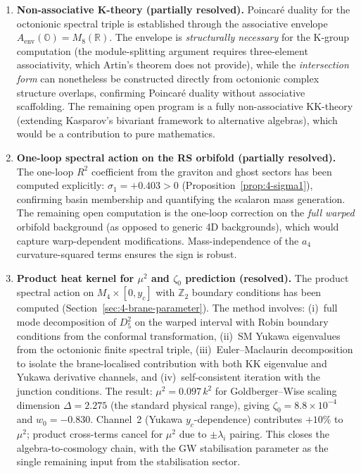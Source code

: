 \begin{enumerate}
  \item \textbf{Non-associative K-theory (partially resolved).} Poincar\'{e} duality for the octonionic spectral triple is established through the associative envelope $A_{\mathrm{env}}(\mathbb{O}) = M_8(\mathbb{R})$.  The envelope is \emph{structurally necessary} for the K-group computation (the module-splitting argument requires three-element associativity, which Artin's theorem does not provide), while the \emph{intersection form} can nonetheless be constructed directly from octonionic complex structure overlaps, confirming Poincar\'{e} duality without associative scaffolding.  The remaining open program is a fully non-associative KK-theory (extending Kasparov's bivariant framework to alternative algebras), which would be a contribution to pure mathematics.

  \item \textbf{One-loop spectral action on the RS orbifold (partially resolved).} The one-loop $R^2$ coefficient from the graviton and ghost sectors has been computed explicitly: $\sigma_1 = +0.403 > 0$ (Proposition~\ref{prop:4-sigma1}), confirming basin membership and quantifying the scalaron mass generation.  The remaining open computation is the one-loop correction on the \emph{full warped} orbifold background (as opposed to generic 4D backgrounds), which would capture warp-dependent modifications.  Mass-independence of the $a_4$ curvature-squared terms ensures the sign is robust.

  \item\label{item:op-8} \textbf{Product heat kernel for $\mu^2$ and $\zeta_0$ prediction (resolved).} The product spectral action on $M_4 \times [0, y_c]$ with $\mathbb{Z}_2$ boundary conditions has been computed (Section~\ref{sec:4-brane-parameter}).  The method involves: (i)~full mode decomposition of $D_5^2$ on the warped interval with Robin boundary conditions from the conformal transformation, (ii)~SM Yukawa eigenvalues from the octonionic finite spectral triple, (iii)~Euler--Maclaurin decomposition to isolate the brane-localised contribution with both KK eigenvalue and Yukawa derivative channels, and (iv)~self-consistent iteration with the junction conditions.  The result: $\mu^2 = 0.097\, k^2$ for Goldberger--Wise scaling dimension $\Delta = 2.275$ (the standard physical range), giving $\zeta_0 = 8.8 \times 10^{-4}$ and $w_0 = -0.830$.  Channel~2 (Yukawa $y_c$-dependence) contributes $+10\%$ to $\mu^2$; product cross-terms cancel for $\mu^2$ due to $\pm\lambda_i$ pairing.  This closes the algebra-to-cosmology chain, with the GW stabilisation parameter as the single remaining input from the stabilisation sector.


\end{enumerate}
